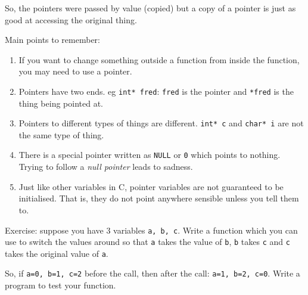 So, the pointers were passed by value (copied) but a copy of a pointer is just as good at accessing the original thing.

Main points to remember:
\begin{enumerate}
 \item If you want to change something outside a function from inside the function, you may need to use a pointer.
 \item Pointers have two ends. eg \lstinline!int* fred!:   \texttt{fred} is the pointer and \texttt{*fred} is the thing 
 being pointed at.
 \item Pointers to different types of things are different. \texttt{int* c} and \texttt{char* i} are not the same type of thing.
 \item There is a special pointer written as \texttt{NULL} or \texttt{0} which points to nothing.
 Trying to follow a \emph{null pointer} leads to sadness.
 \item Just like other variables in C, pointer variables are not guaranteed to be initialised.
 That is, they do not point anywhere sensible unless you tell them to.
\end{enumerate}


Exercise: suppose you have 3 variables \texttt{a, b, c}.
Write a function which you can use to switch the values around so that 
\texttt{a} takes the value of \texttt{b}, \texttt{b} takes \texttt{c}
and \texttt{c} takes the original value of \texttt{a}.

So, if \lstinline{a=0, b=1, c=2} before the call, then after the call:
\lstinline{a=1, b=2, c=0}.
Write a program to test your function.




